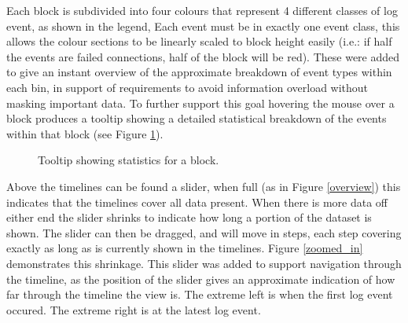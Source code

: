 Each block is subdivided into four colours that represent 4 different classes of log event, as shown in the legend, Each event must be in exactly one event class, this allows the colour sections to be linearly scaled to block height easily (i.e.: if half the events are failed connections, half of the block will be red). These were added to give an instant overview of the approximate breakdown of event types within each bin, in support of requirements to avoid information overload without masking important data. To further support this goal hovering the mouse over a block produces a tooltip showing a detailed statistical breakdown of the events within that block (see Figure \ref{des_tooltip}). 

\begin{figure}[tbh]
\caption{\protect\label{des_tooltip}Tooltip showing statistics for a block.}
\end{figure}

Above the timelines can be found a slider, when full (as in Figure \ref{overview}) this indicates that the timelines cover all data present. When there is more data off either end the slider shrinks to indicate how long a portion of the dataset is shown. The slider can then be dragged, and will move in steps, each step covering exactly as long as is currently shown in the timelines. Figure \ref{zoomed_in} demonstrates this shrinkage. This slider was added to support navigation through the timeline, as the position of the slider gives an approximate indication of how far through the timeline the view is. The extreme left is when the first log event occured. The extreme right is at the latest log event.

